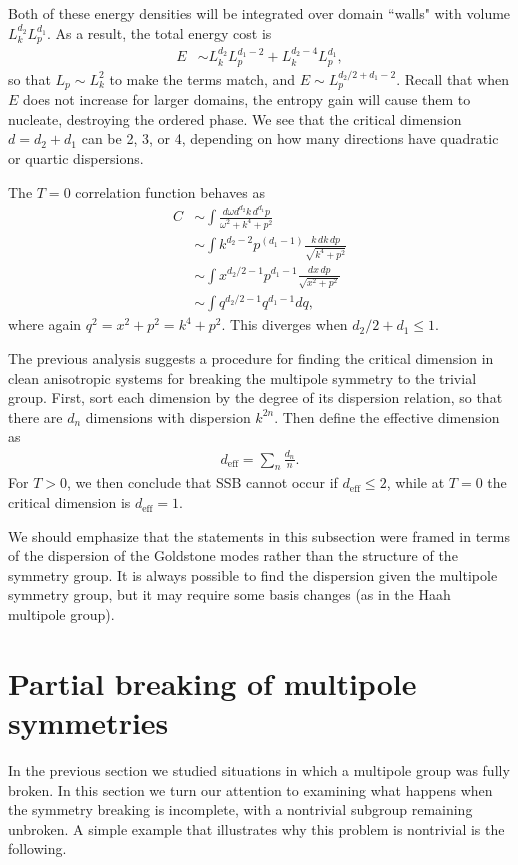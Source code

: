 \documentclass[pra,aps,twocolumn, amsfonts,amsmath,amssymb,nofootinbib,superscriptaddress]{revtex4-2}
\newcommand{\nn}{\nonumber\\}
\newcommand{\eff}{\text{eff}}
\begin{document}
Both of these energy densities will be integrated over domain ``walls" with volume $L_k^{d_2} L_p^{d_1}$.
As a result, the total energy cost is
\begin{align}
E &\sim L_k^{d_2} L_p^{d_1-2} + L_k^{d_2-4} L_p^{d_1},
\end{align}
so that $L_p \sim L_k^2$ to make the terms match, and $E\sim L_p^{d_2/2+d_1-2}$. Recall that when $E$ does not increase for larger domains, the entropy gain will cause them to nucleate, destroying the ordered phase.
We see that the critical dimension $d= d_2 + d_1$ can be 2, 3, or 4, depending on how many directions have quadratic or quartic dispersions.

The $T=0$ correlation function behaves as
\begin{align}
C &\sim \int \frac{d\omega d^{d_2} k \, d^{d_1} p}{\omega^2 + k^4 + p^2}\nn
&\sim \int k^{d_2 - 2} p^{ (d_1-1)} \frac{k\,dk\, dp}{\sqrt{k^4 + p^2}} \nn
&\sim \int x^{d_2/2-1} p^{d_1-1} \frac{dx\, dp}{\sqrt{x^2 + p^2}} \nn
&\sim \int q^{d_2/2 -1} q^{d_1 -1} dq,
\end{align}
where again $q^2 = x^2 + p^2 = k^4 + p^2$. This diverges when $d_2/2 + d_1 \le 1$. 

The previous analysis suggests a procedure for finding the critical dimension in clean anisotropic systems for breaking the multipole symmetry to the trivial group. First, sort each dimension by the degree of its dispersion relation, so that there are $d_n$ dimensions with dispersion $k^{2n}$. Then define the effective dimension as 
\begin{align}
d_\eff = \sum_n \frac{d_n}{n}.
\end{align}
For $T>0$, we then conclude that SSB cannot occur if $d_\eff\le 2$, while at $T=0$ the critical dimension is $d_\eff = 1$.

We should emphasize that the statements in this subsection were framed in terms of the dispersion of the Goldstone modes rather than the structure of the symmetry group. It is always possible to find the dispersion given the multipole symmetry group, but it may require some basis changes (as in the Haah multipole group).

\section{Partial breaking of multipole symmetries} \label{sec:partial}

In the previous section we studied situations in which a multipole group was fully broken. In this section we turn our attention to examining what happens when the symmetry breaking is incomplete, with a nontrivial subgroup remaining unbroken. A simple example that illustrates why this problem is nontrivial is the following. 
 
\end{document}
